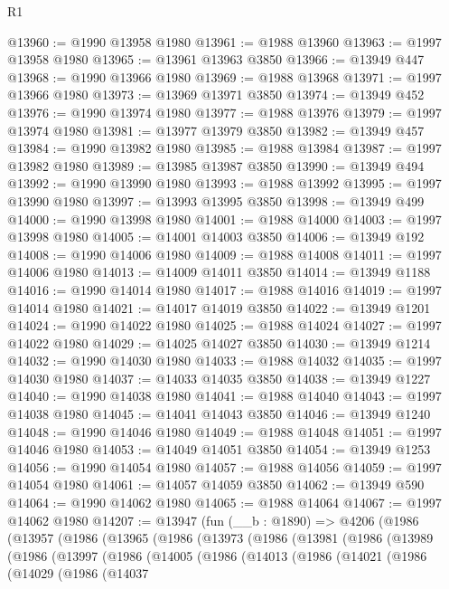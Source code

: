 \begin{lexlean}{R1}
\begin{coremodule}
@13960 := @1990 @13958 @1980
@13961 := @1988 @13960
@13963 := @1997 @13958 @1980
@13965 := @13961 @13963 @3850
@13966 := @13949 @447
@13968 := @1990 @13966 @1980
@13969 := @1988 @13968
@13971 := @1997 @13966 @1980
@13973 := @13969 @13971 @3850
@13974 := @13949 @452
@13976 := @1990 @13974 @1980
@13977 := @1988 @13976
@13979 := @1997 @13974 @1980
@13981 := @13977 @13979 @3850
@13982 := @13949 @457
@13984 := @1990 @13982 @1980
@13985 := @1988 @13984
@13987 := @1997 @13982 @1980
@13989 := @13985 @13987 @3850
@13990 := @13949 @494
@13992 := @1990 @13990 @1980
@13993 := @1988 @13992
@13995 := @1997 @13990 @1980
@13997 := @13993 @13995 @3850
@13998 := @13949 @499
@14000 := @1990 @13998 @1980
@14001 := @1988 @14000
@14003 := @1997 @13998 @1980
@14005 := @14001 @14003 @3850
@14006 := @13949 @192
@14008 := @1990 @14006 @1980
@14009 := @1988 @14008
@14011 := @1997 @14006 @1980
@14013 := @14009 @14011 @3850
@14014 := @13949 @1188
@14016 := @1990 @14014 @1980
@14017 := @1988 @14016
@14019 := @1997 @14014 @1980
@14021 := @14017 @14019 @3850
@14022 := @13949 @1201
@14024 := @1990 @14022 @1980
@14025 := @1988 @14024
@14027 := @1997 @14022 @1980
@14029 := @14025 @14027 @3850
@14030 := @13949 @1214
@14032 := @1990 @14030 @1980
@14033 := @1988 @14032
@14035 := @1997 @14030 @1980
@14037 := @14033 @14035 @3850
@14038 := @13949 @1227
@14040 := @1990 @14038 @1980
@14041 := @1988 @14040
@14043 := @1997 @14038 @1980
@14045 := @14041 @14043 @3850
@14046 := @13949 @1240
@14048 := @1990 @14046 @1980
@14049 := @1988 @14048
@14051 := @1997 @14046 @1980
@14053 := @14049 @14051 @3850
@14054 := @13949 @1253
@14056 := @1990 @14054 @1980
@14057 := @1988 @14056
@14059 := @1997 @14054 @1980
@14061 := @14057 @14059 @3850
@14062 := @13949 @590
@14064 := @1990 @14062 @1980
@14065 := @1988 @14064
@14067 := @1997 @14062 @1980
@14207 := @13947
    (fun (__b : @1890) =>
    @4206
      (@1986
        (@13957
          (@1986
            (@13965
              (@1986
                (@13973
                  (@1986
                    (@13981
                      (@1986
                        (@13989
                          (@1986
                            (@13997
                              (@1986
                                (@14005
                                  (@1986
                                    (@14013
                                      (@1986
                                        (@14021
                                          (@1986
                                            (@14029
                                              (@1986
                                                (@14037

\end{coremodule}
\end{lexlean}
